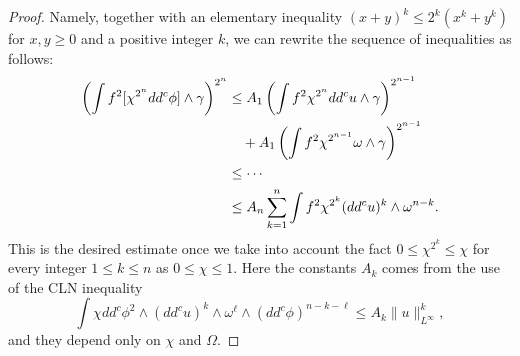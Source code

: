 \documentclass[10pt,a4paper]{amsart}
\newcommand{\Om}{\Omega}
\newcommand{\ga}{\gamma}
\newcommand{\om}{\omega}
\newcommand{\wed}{\wedge}
\begin{document}
\begin{proof}
Namely, together with an elementary inequality $(x+y)^k \leq 2^k (x^k + y^k)$ for $x,y\geq 0$ and a positive integer $k$, we can rewrite the sequence of inequalities as follows:
\[\notag\begin{aligned}
	\left(\int f^2 [\chi^{2^n} dd^c\phi] \wed \ga\right)^{2^n} 
&\leq A_1 \left( \int f^2 \chi^{2^{n}} dd^c u  \wed \ga \right)^{2^{n-1}}  \\
&\quad + A_1 \left( \int f^2 \chi^{2^{n-1}} \om \wed \ga \right)^{2^{n-1}} \\
&\leq \cdots  \\
&\leq A_n  \sum_{k=1}^n  \int f^2 \chi^{2^{k}} (dd^cu)^k \wed \om^{n-k}. 
\end{aligned}\]
This is the desired estimate once we take into account the fact  $0 \leq \chi^{2^k} \leq \chi$ for every integer $1\leq k\leq n$ as $0\leq \chi \leq 1$.
Here the constants $A_k$ comes from the use of the CLN inequality
$$
	\int \chi dd^c\phi^2 \wed (dd^c u)^k \wed \om^{\ell} \wed (dd^c\phi)^{n-k-\ell} \leq A_k \|u\|_{L^\infty}^k,
$$
and they depend only on $\chi$ and $\Om$.
\end{proof}
\end{document}

